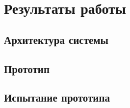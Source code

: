 \chapter{Результаты работы}
\section{Архитектура системы}
\section{Прототип}
\section{Испытание прототипа}



\clearpage